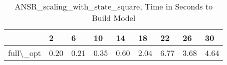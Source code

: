\begin{table}
\centering
\caption{ANSR\_scaling\_with\_state\_square, Time in Seconds to Build Model}
\label{ANSR_scaling_with_state_square_model_time}
\begin{tabular}{lllllllll}
\toprule
{} &     2 &     6 &    10 &    14 &    18 &    22 &    26 &    30 \\
\midrule
full\textbackslash \_opt &  0.20 &  0.21 &  0.35 &  0.60 &  2.04 &  6.77 &  3.68 &  4.64 \\
\bottomrule
\end{tabular}
\end{table}
